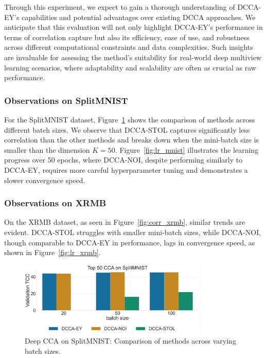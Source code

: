 Through this experiment, we expect to gain a thorough understanding of DCCA-EY's capabilities and potential advantages over existing DCCA approaches. We anticipate that this evaluation will not only highlight DCCA-EY's performance in terms of correlation capture but also its efficiency, ease of use, and robustness across different computational constraints and data complexities. Such insights are invaluable for assessing the method's suitability for real-world deep multiview learning scenarios, where adaptability and scalability are often as crucial as raw performance.

\subsubsection{Observations on SplitMNIST}
For the SplitMNIST dataset, Figure~\ref{fig:corr_mnist} shows the comparison of methods across different batch sizes.
We observe that DCCA-STOL captures significantly less correlation than the other methods and breaks down when the mini-batch size is smaller than the dimension $K=50$.
Figure~\ref{fig:lr_mnist} illustrates the learning progress over 50 epochs, where DCCA-NOI, despite performing similarly to DCCA-EY, requires more careful hyperparameter tuning and demonstrates a slower convergence speed.

\subsubsection{Observations on XRMB}
On the XRMB dataset, as seen in Figure~\ref{fig:corr_xrmb}, similar trends are evident.
DCCA-STOL struggles with smaller mini-batch sizes, while DCCA-NOI, though comparable to DCCA-EY in performance, lags in convergence speed, as shown in Figure~\ref{fig:lr_xrmb}.

\begin{figure}
    \centering
    \includegraphics[width=0.8\textwidth]{figures/DCCA/SplitMNIST_models_different_batch_sizes}
    \caption{Deep CCA on SplitMNIST: Comparison of methods across varying batch sizes.}
    \label{fig:corr_mnist}
\end{figure}


